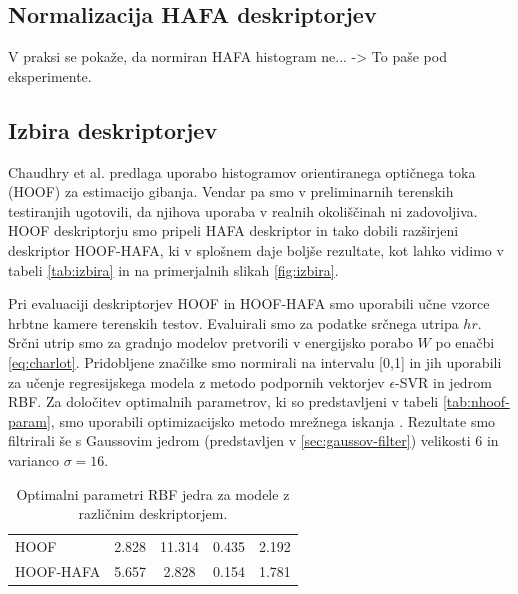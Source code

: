 \subsection{Normalizacija HAFA deskriptorjev}
V praksi se pokaže, da normiran HAFA histogram ne... -> To paše pod eksperimente.




\subsection{Izbira deskriptorjev}

Chaudhry et al. \cite{chaudhry2009histograms} predlaga uporabo histogramov orientiranega optičnega toka (HOOF) za estimacijo gibanja. Vendar pa smo v preliminarnih terenskih testiranjih \cite{koporec2017observation} ugotovili, da njihova uporaba v realnih okoliščinah ni zadovoljiva. HOOF deskriptorju smo pripeli HAFA deskriptor in tako dobili razširjeni deskriptor HOOF-HAFA, ki v splošnem daje boljše rezultate, kot lahko vidimo v tabeli \ref{tab:izbira} in na primerjalnih slikah \ref{fig:izbira}.

Pri evaluaciji deskriptorjev HOOF in HOOF-HAFA smo uporabili učne vzorce hrbtne kamere terenskih testov. Evaluirali smo za podatke srčnega utripa $hr$. Srčni utrip smo za gradnjo modelov pretvorili v energijsko porabo $W$ po enačbi \eqref{eq:charlot}. Pridobljene značilke smo normirali na intervalu [0,1] in jih uporabili za učenje regresijskega modela z metodo podpornih vektorjev $\epsilon$-SVR in jedrom RBF. Za določitev optimalnih parametrov, ki so predstavljeni v tabeli \ref{tab:nhoof-param}, smo uporabili optimizacijsko metodo mrežnega iskanja \cite{hsu2003practical}. Rezultate smo filtrirali še s Gaussovim jedrom (predstavljen v \ref{sec:gaussov-filter}) velikosti $6$ in varianco $\sigma=16$. 

\begin{table}[htb]
	\centering
    \begin{tabular}{l S[table-format=2.3] S[table-format=1.3] S[table-format=1.3] S[table-format=1.3]}
    \toprule
     &  & \thead{$\mathbf{\gamma}$} & \thead{$\mathbf{\epsilon}$} &  \\ 
    \midrule
    HOOF & 2.828 & 11.314 & 0.435 & 2.192 \\
    HOOF-HAFA & 5.657 & 2.828 & 0.154 & 1.781 \\
    \bottomrule
    \end{tabular}
    \caption[Optimalni parameteri RBF jedra modelov za izbiro deskriptorjev]{Optimalni parametri RBF jedra za modele z različnim deskriptorjem.}
    \label{tab:izbira-param}
\end{table}


